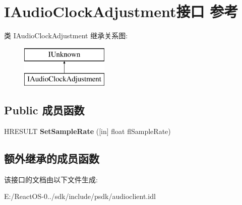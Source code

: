 \hypertarget{interface_i_audio_clock_adjustment}{}\section{I\+Audio\+Clock\+Adjustment接口 参考}
\label{interface_i_audio_clock_adjustment}
类 I\+Audio\+Clock\+Adjustment 继承关系图\+:\begin{figure}[H]
\begin{center}
\leavevmode
\includegraphics[height=2.000000cm]{interface_i_audio_clock_adjustment}
\end{center}
\end{figure}
\subsection*{Public 成员函数}
\begin{DoxyCompactItemize}
\item 
\mbox{\label{interface_i_audio_clock_adjustment_a0c9a62169152974d17ff6b4ba5710a8c}} 
H\+R\+E\+S\+U\+LT {\bfseries Set\+Sample\+Rate} (\mbox{[}in\mbox{]} float fl\+Sample\+Rate)
\end{DoxyCompactItemize}
\subsection*{额外继承的成员函数}


该接口的文档由以下文件生成\+:\begin{DoxyCompactItemize}
\item 
E\+:/\+React\+O\+S-\/0../sdk/include/psdk/audioclient.\+idl\end{DoxyCompactItemize}
